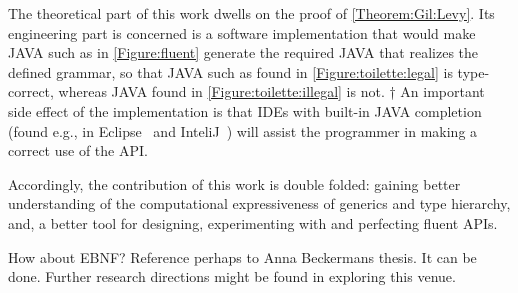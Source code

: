 The theoretical part of this work dwells on the proof of
  \cref{Theorem:Gil:Levy}.
Its engineering part is concerned is
  a software implementation that would make JAVA
  such as in \cref{Figure:fluent} generate
  the required \Java JAVA that realizes the
  defined grammar, so that JAVA such as
  found in \cref{Figure:toilette:legal} is type-correct,
  whereas JAVA found in \cref{Figure:toilette:illegal} is not.
†{%
An important side effect of the implementation is that IDEs with built-in JAVA
completion
 (found e.g., in Eclipse~\cite{Eclipse:2009} and InteliJ~\cite{Jetbrains:2003})
 will assist the programmer in making a correct use of the API.
 }

Accordingly, the contribution of this work is double folded:
  gaining better understanding of the computational expressiveness of
  \Java generics and type hierarchy, and, a better tool
  for designing, experimenting with and perfecting fluent APIs.

How about EBNF? Reference perhaps to Anna Beckermans thesis.\cite{Tomer:also try to trace citations from wikipedia}
It can be done. Further research directions might be found in exploring this venue. 
